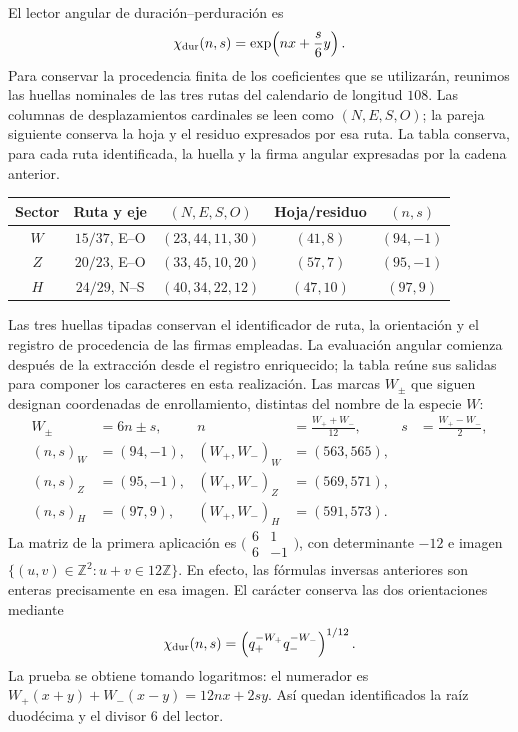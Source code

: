 El lector angular de duración--perduración es
\begin{equation}
 \chi_{\rm dur}(n,s)=\exp\!\left(nx+\frac{s}{6}y\right).
 \label{amp-higgs-caracter}
\end{equation}
Para conservar la procedencia finita de los coeficientes que se utilizarán,
reunimos las huellas nominales de las tres rutas del calendario de longitud
$108$. Las columnas de desplazamientos cardinales se leen como $(N,E,S,O)$;
la pareja siguiente conserva la hoja y el residuo expresados por esa ruta.
La tabla conserva, para cada ruta identificada, la huella y la firma
angular expresadas por la cadena anterior.
\begin{center}
\small
\begin{tabular}{c c c c c}
\hline
Sector & Ruta y eje & $(N,E,S,O)$ & Hoja/residuo & $(n,s)$\\
\hline
$W$ & $15/37$, E--O & $(23,44,11,30)$ & $(41,8)$ & $(94,-1)$\\
$Z$ & $20/23$, E--O & $(33,45,10,20)$ & $(57,7)$ & $(95,-1)$\\
$H$ & $24/29$, N--S & $(40,34,22,12)$ & $(47,10)$ & $(97,9)$\\
\hline
\end{tabular}
\end{center}
Las tres huellas tipadas conservan el identificador de ruta, la orientación
y el registro de procedencia de las firmas empleadas. La evaluación angular
comienza después de la extracción desde el registro enriquecido; la tabla
reúne sus salidas para componer los caracteres en esta realización.
Las marcas $W_\pm$ que siguen designan coordenadas de enrollamiento,
distintas del nombre de la especie $W$:
\begin{equation}
 \begin{aligned}
 W_\pm&=6n\pm s, &
 n&=\frac{W_++W_-}{12},& s&=\frac{W_+-W_-}{2},\\
 (n,s)_W&=(94,-1), & (W_+,W_-)_W&=(563,565),\\
 (n,s)_Z&=(95,-1), & (W_+,W_-)_Z&=(569,571),\\
 (n,s)_H&=(97,9), & (W_+,W_-)_H&=(591,573).
 \end{aligned}
 \label{amp-higgs-firmas}
\end{equation}
La matriz de la primera aplicación es
$\bigl(\begin{smallmatrix}6&1\\6&-1\end{smallmatrix}\bigr)$, con determinante
$-12$ e imagen $\{(u,v)\in\mathbb Z^2:u+v\in12\mathbb Z\}$.
En efecto, las fórmulas inversas anteriores son enteras precisamente en
esa imagen. El carácter conserva las dos orientaciones mediante
\begin{equation}
 \chi_{\rm dur}(n,s)
 =\left(q_+^{-W_+}q_-^{-W_-}\right)^{1/12}.
 \label{amp-higgs-caracter-canales}
\end{equation}
La prueba se obtiene tomando logaritmos: el numerador es
$W_+(x+y)+W_-(x-y)=12nx+2sy$.
Así quedan identificados la raíz duodécima y el divisor $6$ del lector.

